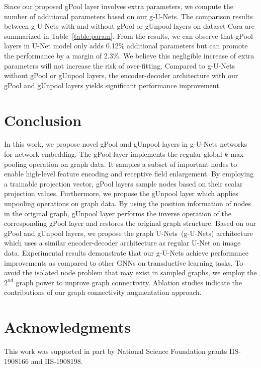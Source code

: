 \documentclass{article}
\begin{document}
Since our proposed gPool layer involves extra parameters, we compute
the number of additional parameters based on our g-U-Nets. The
comparison results between g-U-Nets with and without gPool or
gUnpool layers on dataset Cora are summarized in
Table~\ref{table:param}. From the results, we can observe that gPool
layers in U-Net model only adds 0.12\% additional parameters but can
promote the performance by a margin of 2.3\%. We believe this
negligible increase of extra parameters will not increase the risk
of over-fitting. Compared to g-U-Nets without gPool or gUnpool
layers, the encoder-decoder architecture with our gPool and gUnpool
layers yields significant performance improvement.



\section{Conclusion}

In this work, we propose novel gPool and gUnpool layers in g-U-Nets
networks for network embedding. The gPool layer implements the
regular global $k$-max pooling operation on graph data. It samples a
subset of important nodes to enable high-level feature encoding and
receptive field enlargement. By employing a trainable projection
vector, gPool layers sample nodes based on their scalar projection
values. Furthermore, we propose the gUnpool layer which applies
unpooling operations on graph data. By using the position
information of nodes in the original graph, gUnpool layer performs
the inverse operation of the corresponding gPool layer and restores
the original graph structure. Based on our gPool and gUnpool layers,
we propose the graph U-Nets~(g-U-Nets) architecture which uses a
similar encoder-decoder architecture as regular U-Net on image data.
Experimental results demonstrate that our g-U-Nets achieve
performance improvements as compared to other GNNs on transductive
learning tasks. To avoid the isolated node problem that may exist in
sampled graphs, we employ the $2^{nd}$ graph power to improve graph
connectivity. Ablation studies indicate the contributions of our
graph connectivity augmentation approach.

\clearpage

\section*{Acknowledgments}

This work was supported in part by National Science Foundation grants
IIS-1908166 and IIS-1908198.






\end{document}
